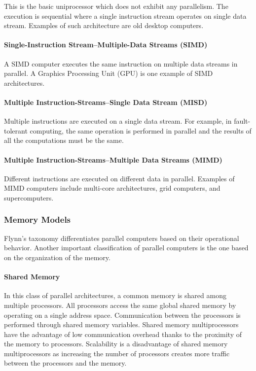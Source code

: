 This is the basic uniprocessor which does not exhibit any parallelism. The execution is sequential where a single instruction stream operates on single data stream. Examples of such architecture are old desktop computers.

\paragraph{Single-Instruction Stream--Multiple-Data Streams (SIMD)}

A SIMD computer executes the same instruction on multiple data streams in parallel. A Graphics Processing Unit (GPU) is one example of SIMD architectures.

\paragraph{Multiple Instruction-Streams--Single Data Stream (MISD)}

Multiple instructions are executed on a single data stream. For example, in fault-tolerant computing, the same operation is performed in parallel and the results of all the computations must be the same.

\paragraph{Multiple Instruction-Streams--Multiple Data Streams (MIMD)}

Different instructions are executed on different data in parallel. Examples of MIMD computers include multi-core architectures, grid computers, and supercomputers.

\subsubsection{Memory Models}

Flynn's taxonomy differentiates parallel computers based on their operational behavior. Another important classification of parallel computers is the one based on the organization of the memory.

\paragraph{Shared Memory}

In this class of parallel architectures, a common memory is shared among multiple processors. All processors access the same global shared memory by operating on a single address space. Communication between the processors is performed through shared memory variables. Shared memory multiprocessors have the advantage of low communication overhead thanks to the proximity of the memory to processors. Scalability is a disadvantage of shared memory multiprocessors as increasing the number of processors creates more traffic between the processors and the memory.

